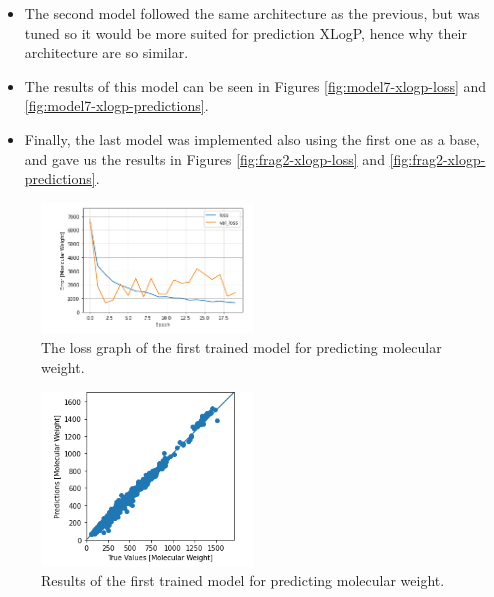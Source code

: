 \begin{itemize}
        \item The second model followed the same architecture as the previous, but was tuned so it would be more suited for prediction XLogP, hence why their architecture are so similar.
        \item The results of this model can be seen in Figures \ref{fig:model7-xlogp-loss} and \ref{fig:model7-xlogp-predictions}.
        \item Finally, the last model was implemented also using the first one as a base, and gave us the results in Figures \ref{fig:frag2-xlogp-loss} and \ref{fig:frag2-xlogp-predictions}.
    \end{itemize}
    
    \begin{figure}
        \centering
        \includegraphics[width=0.5\textwidth]{loss_gragh_20_epoch.PNG}
        \caption{The loss graph of the first trained model for predicting molecular weight.}
        \label{fig:model2-mol-weight-loss}
    \end{figure}
    \begin{figure}
        \centering
        \includegraphics[width=0.5\textwidth]{model_2_prediction.PNG}
        \caption{Results of the first trained model for predicting molecular weight.}
        \label{fig:model2-mol-weight-predictions}
    \end{figure}
    
